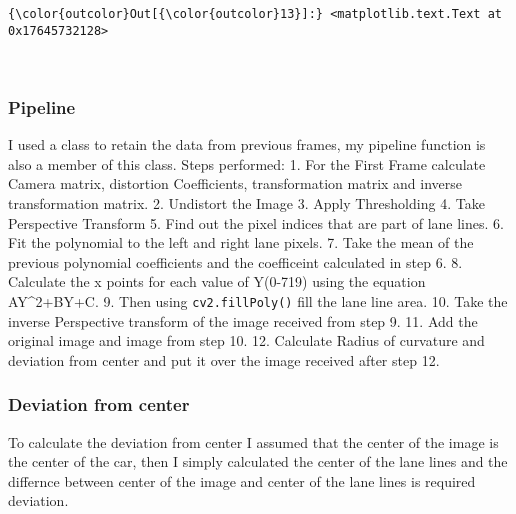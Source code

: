 \documentclass[11pt]{article}
\begin{document}
\begin{Verbatim}[commandchars=\\\{\}]
{\color{outcolor}Out[{\color{outcolor}13}]:} <matplotlib.text.Text at 0x17645732128>
\end{Verbatim}
            
    \begin{center}
    \end{center}
    { \hspace*{\fill} \\}
    
    \hypertarget{pipeline}{%
\subsubsection{Pipeline}\label{pipeline}}

I used a class to retain the data from previous frames, my pipeline
function is also a member of this class. Steps performed: 1. For the
First Frame calculate Camera matrix, distortion Coefficients,
transformation matrix and inverse transformation matrix. 2. Undistort
the Image 3. Apply Thresholding 4. Take Perspective Transform 5. Find
out the pixel indices that are part of lane lines. 6. Fit the polynomial
to the left and right lane pixels. 7. Take the mean of the previous
polynomial coefficients and the coefficeint calculated in step 6. 8.
Calculate the x points for each value of Y(0-719) using the equation
AY\^{}2+BY+C. 9. Then using \texttt{cv2.fillPoly()} fill the lane line
area. 10. Take the inverse Perspective transform of the image received
from step 9. 11. Add the original image and image from step 10. 12.
Calculate Radius of curvature and deviation from center and put it over
the image received after step 12.

\hypertarget{deviation-from-center}{%
\subsubsection{Deviation from center}\label{deviation-from-center}}

To calculate the deviation from center I assumed that the center of the
image is the center of the car, then I simply calculated the center of
the lane lines and the differnce between center of the image and center
of the lane lines is required deviation.
\end{document}

